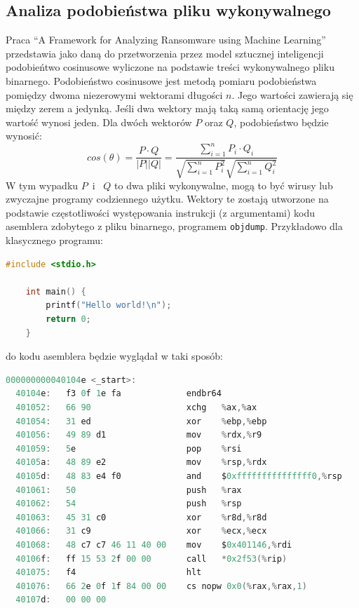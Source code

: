 \subsection{Analiza podobieństwa pliku wykonywalnego}
\label{sec:binaries}
Praca \foreignquote{english}{A Framework for Analyzing Ransomware using
Machine Learning}~\cite{8628743} przedstawia jako daną do przetworzenia 
przez model sztucznej inteligencji podobieńtwo cosinusowe wyliczone na 
podstawie treści wykonywalnego pliku binarnego. Podobieństwo cosinusowe
jest metodą pomiaru podobieństwa pomiędzy dwoma niezerowymi wektorami długości $n$.
Jego wartości zawierają się między zerem a jedynką. Jeśli dwa wektory mają taką samą
orientację jego wartość wynosi jeden. Dla dwóch wektorów $P$ oraz $Q$, podobieństwo 
będzie wynosić:
$$
cos(\theta) = \frac{P \cdot Q}{|P||Q|} = \frac{\sum_{i = 1}^{n} P_{i} \cdot Q_{i}}{\sqrt{\sum_{i = 1}^{n}P^{2}_{i}} \sqrt{\sum_{i = 1}^{n}Q^{2}_{i}}}
$$
W tym wypadku $P$~i~ $Q$ to dwa pliki wykonywalne, mogą to być wirusy lub zwyczajne programy codziennego użytku. Wektory te zostają utworzone na 
podstawie częstotliwości występowania instrukcji (z argumentami) kodu asemblera zdobytego z pliku binarnego, programem
\texttt{objdump}. Przykładowo dla klasycznego programu:
\begin{lstlisting}[language=C,
    backgroundcolor=\color{EEGold!5!white},
    caption={Elementarny program w C.},
    label={lst:ello}]
    #include <stdio.h>

    int main() {
        printf("Hello world!\n");
        return 0;
    }
\end{lstlisting}
do kodu asemblera będzie wyglądał w taki sposób:
\begin{lstlisting}[language=C,
    backgroundcolor=\color{EEGold!5!white},
    caption={Fragment asemblerowego kodu programu z listingu 3.},
    label={lst:ello2}]
000000000040104e <_start>:
  40104e:	f3 0f 1e fa          	endbr64
  401052:	66 90                	xchg   %ax,%ax
  401054:	31 ed                	xor    %ebp,%ebp
  401056:	49 89 d1             	mov    %rdx,%r9
  401059:	5e                   	pop    %rsi
  40105a:	48 89 e2             	mov    %rsp,%rdx
  40105d:	48 83 e4 f0          	and    $0xfffffffffffffff0,%rsp
  401061:	50                   	push   %rax
  401062:	54                   	push   %rsp
  401063:	45 31 c0             	xor    %r8d,%r8d
  401066:	31 c9                	xor    %ecx,%ecx
  401068:	48 c7 c7 46 11 40 00 	mov    $0x401146,%rdi
  40106f:	ff 15 53 2f 00 00    	call   *0x2f53(%rip) 
  401075:	f4                   	hlt
  401076:	66 2e 0f 1f 84 00 00 	cs nopw 0x0(%rax,%rax,1)
  40107d:	00 00 00 
\end{lstlisting}

